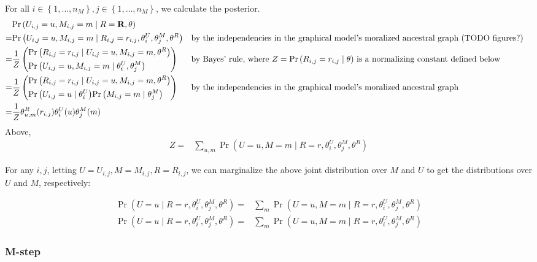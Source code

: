 \documentclass{article}
\newcommand{\PO}   [1]{{ \Pr \left( #1 \right) }}
\newcommand{\PP}   [2]{{ \PO{ #1 \mid #2 } }}
\newcommand{\mat}  [1]{{ \bf #1 }}
\newcommand{\range}[1]{{ \left\{ 1, \dots, #1 \right\} }}
\begin{document}
For all $i \in \range{n_M}, j \in \range{n_M}$, we calculate the
posterior.
\begin{align}
& \PP{ U_{i,j} = u, M_{i,j} = m }{ R = \mat{R}, \theta } \\
=& \PP{ U_{i,j} = u, M_{i,j} = m }{ R_{i,j} = r_{i,j}, \theta^U_i,
  \theta^M_j, \theta^R }
&&
\text{by
the independencies in the graphical model's moralized ancestral graph
(TODO figures?)} \\
=& \frac{1}{Z} \left(
\begin{aligned}
& \PP{R_{i,j} = r_{i,j} }{U_{i,j} = u, M_{i,j} = m, \theta^R} \\
& \PP{U_{i,j} = u, M_{i,j} = m}{\theta^U_i, \theta^M_j}
\end{aligned} \right)
&& \text{by Bayes' rule, where $Z = \PP{R_{i,j} = r_{i,j}}{\theta}$ is a
  normalizing constant defined below} \\
=& \frac{1}{Z} \left(
\begin{aligned}
& \PP{R_{i,j} = r_{i,j} }{U_{i,j} = u, M_{i,j} = m, \theta^R} \\
& \PP{U_{i,j} = u }{\theta^U_i}
  \PP{M_{i,j} = m }{\theta^M_j}
\end{aligned} \right)
&& \text{by the independencies in the graphical model's
  moralized ancestral graph} \\
=& \frac{1}{Z} \theta^R_{u,m}(r_{i,j}) \theta^U_i(u) \theta^M_j(m)
\end{align}
Above,
\begin{align}
  Z =& \sum_{u,m} \PP{U = u, M = m}{R = r, \theta^U_i, \theta^M_j,
    \theta^R}
\end{align}

For any $i,j$,
letting $U = U_{i,j}, M = M_{i,j}, R = R_{i,j}$,
we can marginalize the above joint distribution over $M$ and $U$
to get the distributions over $U$ and $M$, respectively:

\begin{align}
  \PP{U = u}{R = r, \theta^U_i, \theta^M_j, \theta^R}
  =& \sum_m \PP{U = u, M = m}{R = r, \theta^U_i, \theta^M_j, \theta^R}
\\
  \PP{U = u}{R = r, \theta^U_i, \theta^M_j, \theta^R}
  =& \sum_m \PP{U = u, M = m}{R = r, \theta^U_i, \theta^M_j, \theta^R}
\end{align}

\subsubsection{M-step}
\end{document}

